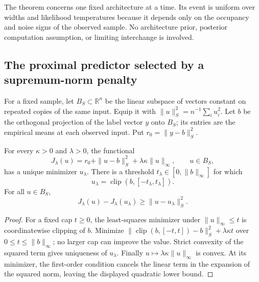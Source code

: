 The theorem concerns one fixed architecture at a time. Its event is uniform over widths and likelihood temperatures because it depends only on the occupancy and noise signs of the observed sample. No architecture prior, posterior computation assumption, or limiting interchange is involved.

\subsection{The proximal predictor selected by a supremum-norm penalty}
For a fixed sample, let $B_S\subset\mathbb R^n$ be the linear subspace of vectors constant on repeated copies of the same input. Equip it with $\|u\|_S^2=n^{-1}\sum_i u_i^2$. Let $b$ be the orthogonal projection of the label vector $y$ onto $B_S$; its entries are the empirical means at each observed input. Put $r_0=\|y-b\|_S^2$.

\begin{lemma}
\label{lem:canonical-prox}
For every $\kappa>0$ and $\lambda>0$, the functional
\[
 J_\lambda(u)=r_0+\|u-b\|_S^2+\lambda\kappa\|u\|_\infty,
 \qquad u\in B_S,
\]
has a unique minimizer $u_\lambda$. There is a threshold $t_\lambda\in[0,\|b\|_\infty]$ for which
\[
 u_\lambda=\operatorname{clip}(b,[-t_\lambda,t_\lambda]).
\]
For all $u\in B_S$,
\[
 J_\lambda(u)-J_\lambda(u_\lambda)\ge\|u-u_\lambda\|_S^2.
\]
\end{lemma}
\begin{proof}
For a fixed cap $t\ge0$, the least-squares minimizer under $\|u\|_\infty\le t$ is coordinatewise clipping of $b$. Minimize $\|\operatorname{clip}(b,[-t,t])-b\|_S^2+\lambda\kappa t$ over $0\le t\le\|b\|_\infty$; no larger cap can improve the value. Strict convexity of the squared term gives uniqueness of $u_\lambda$. Finally $u\mapsto\lambda\kappa\|u\|_\infty$ is convex. At its minimizer, the first-order condition cancels the linear term in the expansion of the squared norm, leaving the displayed quadratic lower bound.
\end{proof}

